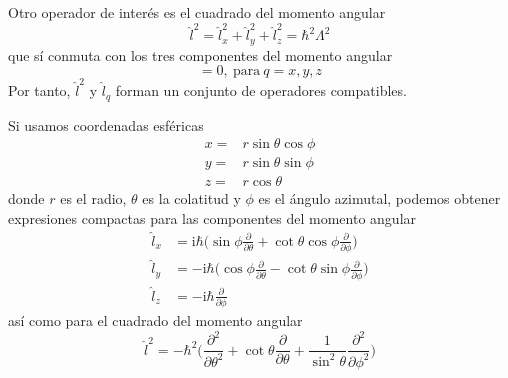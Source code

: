 \documentclass{tufte-handout}
\begin{document}
Otro operador de interés es el cuadrado del momento angular
\begin{equation}
    \hat{l}^2=\hat{l}_x^2+\hat{l}_y^2+\hat{l}_z^2=
    \hbar^2\Lambda^2
\end{equation}
que sí conmuta con los tres componentes del momento angular
\begin{equation}
    [ \hat{l}^2,  \hat{l}_q] = 0,\mathrm{~ para~}q=x, y, z
\end{equation}
Por tanto, $\hat{l}^2$ y $\hat{l}_q$ forman un conjunto de 
operadores compatibles.

Si usamos coordenadas esféricas 
\begin{subequations}
\begin{align}
    x=&r\sin\theta\cos\phi\\
    y=&r\sin\theta\sin\phi\\
    z=&r\cos\theta
\end{align}
\end{subequations}
donde $r$ es el radio, $\theta$ es la colatitud y 
$\phi$ es el ángulo azimutal, podemos obtener expresiones
compactas para las componentes del momento angular
\begin{subequations}
    \begin{align}
        \hat{l}_x&= 
        \mathrm{i}\hbar\bigg(
        \sin{\phi}\frac{\partial}{\partial \theta} +
        \cot{\theta}\cos{\phi} \frac{\partial}{\partial\phi}
        \bigg) \\
        \hat{l}_y&= 
        -\mathrm{i}\hbar\bigg(
        \cos{\phi}\frac{\partial}{\partial \theta} -
        \cot{\theta}\sin{\phi} \frac{\partial}{\partial\phi}
        \bigg) \\
        \hat{l}_z&=  -\mathrm{i}\hbar\frac{\partial}{\partial \phi}
    \end{align}\label{eq:lz}
\end{subequations}
así como para el cuadrado del momento angular
\begin{equation}
    \hat{l}^2= -\hbar^2\bigg(
    \frac{\partial^2}{\partial \theta^2} +
        \cot{\theta}\frac{\partial}{\partial \theta} + 
        \frac{1}{\sin^2\theta}\frac{\partial^2}{\partial\phi^2}
        \bigg)
\end{equation}
\end{document}
